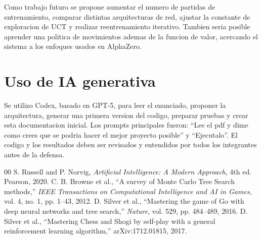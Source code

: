 \documentclass[conference,a4paper]{IEEEtran}
\begin{document}
Como trabajo futuro se propone aumentar el numero de partidas de entrenamiento,
comparar distintas arquitecturas de red, ajustar la constante de exploracion de
UCT y realizar reentrenamiento iterativo. Tambien seria posible aprender una
politica de movimientos ademas de la funcion de valor, acercando el sistema a
los enfoques usados en AlphaZero.

\section*{Uso de IA generativa}

Se utilizo Codex, basado en GPT-5, para leer el enunciado, proponer la
arquitectura, generar una primera version del codigo, preparar pruebas y crear
esta documentacion inicial. Los prompts principales fueron: ``Lee el pdf y dime
como crees que se podria hacer el mejor proyecto posible'' y ``Ejecutalo''. El
codigo y los resultados deben ser revisados y entendidos por todos los
integrantes antes de la defensa.

\begin{thebibliography}{00}
 S. Russell and P. Norvig, \emph{Artificial Intelligence:
A Modern Approach}, 4th ed. Pearson, 2020.
 C. B. Browne et al., ``A survey of Monte Carlo Tree Search
methods,'' \emph{IEEE Transactions on Computational Intelligence and AI in
Games}, vol. 4, no. 1, pp. 1--43, 2012.
 D. Silver et al., ``Mastering the game of Go with deep
neural networks and tree search,'' \emph{Nature}, vol. 529, pp. 484--489, 2016.
 D. Silver et al., ``Mastering Chess and Shogi by self-play
with a general reinforcement learning algorithm,'' arXiv:1712.01815, 2017.
\end{thebibliography}
\end{document}
